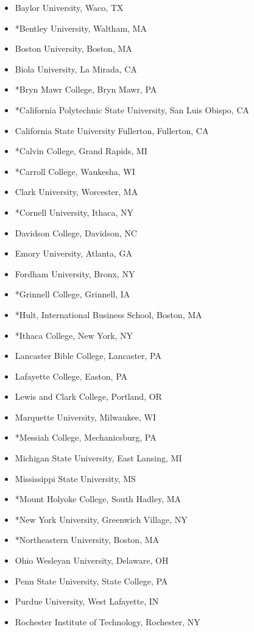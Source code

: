 \documentclass{report}
\begin{document}
\begin{itemize}
\item Baylor University, Waco, TX
\item *Bentley University, Waltham, MA
\item Boston University, Boston, MA
\item Biola University, La Mirada, CA
\item *Bryn Mawr College, Bryn Mawr, PA
\item *California Polytechnic State University, San Luis Obispo, CA
\item California State University Fullerton, Fullerton, CA
\item *Calvin College, Grand Rapids, MI
\item *Carroll College, Waukesha, WI
\item Clark University, Worcester, MA
\item *Cornell University, Ithaca, NY
\item Davidson College, Davidson, NC
\item Emory University, Atlanta, GA
\item Fordham University, Bronx, NY
\item *Grinnell College, Grinnell, IA
\item *Hult, International Business School, Boston, MA
\item *Ithaca College, New York, NY
\item Lancaster Bible College, Lancaster, PA
\item Lafayette College, Easton, PA
\item Lewis and Clark College, Portland, OR
\item Marquette University, Milwaukee, WI
\item *Messiah College, Mechanicsburg, PA
\item Michigan State University, East Lansing, MI
\item Mississippi State University, MS
\item *Mount Holyoke College, South Hadley, MA
\item *New York University, Greenwich Village, NY
\item *Northeastern University, Boston, MA
\item Ohio Wesleyan University, Delaware, OH
\item Penn State University, State College, PA
\item Purdue University, West Lafayette, IN
\item Rochester Institute of Technology, Rochester, NY

\end{itemize}
\end{document}
